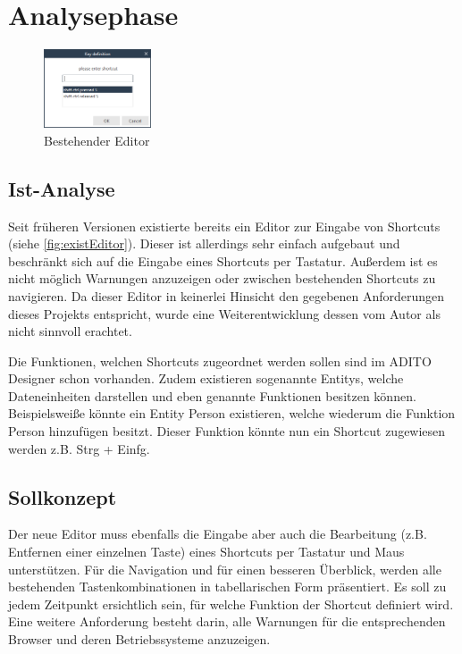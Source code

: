 \section{Analysephase}

\begin{figure}
	\vspace{-12px}
	\centering
	\includegraphics[width=120px]{../graphic/images/screenshots/Alter-Editor}
	\caption{Bestehender Editor}
	\label{fig:existEditor}
\end{figure}

\subsection{Ist-Analyse}

Seit früheren Versionen existierte bereits ein Editor zur Eingabe von Shortcuts (siehe \autoref{fig:existEditor}). Dieser ist allerdings sehr einfach aufgebaut und beschränkt sich auf die Eingabe eines Shortcuts per Tastatur. Außerdem ist es nicht möglich Warnungen anzuzeigen oder zwischen bestehenden Shortcuts zu navigieren. Da dieser Editor in keinerlei Hinsicht den gegebenen Anforderungen dieses Projekts entspricht, wurde eine Weiterentwicklung dessen vom Autor als nicht sinnvoll erachtet.

Die Funktionen, welchen Shortcuts zugeordnet werden sollen sind im ADITO Designer schon vorhanden. Zudem existieren sogenannte Entitys, welche Dateneinheiten darstellen und eben genannte Funktionen besitzen können. Beispielsweiße könnte ein Entity \glqq Person\grqq\xspace existieren, welche wiederum die Funktion \glqq Person hinzufügen\grqq\xspace besitzt. Dieser Funktion könnte nun ein Shortcut zugewiesen werden z.B. Strg + Einfg.

\subsection{Sollkonzept}

Der neue Editor muss ebenfalls die Eingabe aber auch die Bearbeitung (z.B. Entfernen einer einzelnen Taste) eines Shortcuts per Tastatur und Maus unterstützen. Für die Navigation und für einen besseren Überblick, werden alle bestehenden Tastenkombinationen in tabellarischen Form präsentiert. Es soll zu jedem Zeitpunkt ersichtlich sein, für welche Funktion der Shortcut definiert wird. Eine weitere Anforderung besteht darin, alle Warnungen für die entsprechenden Browser und deren Betriebssysteme anzuzeigen.

